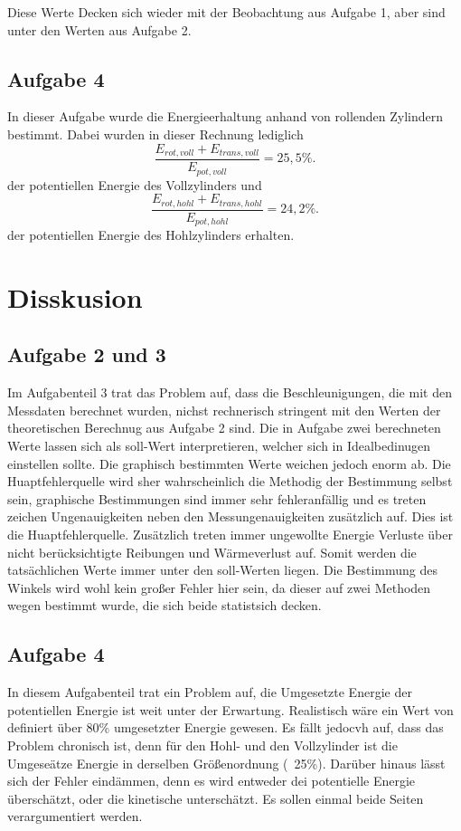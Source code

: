 Diese Werte Decken sich wieder mit der Beobachtung aus Aufgabe 1, aber sind unter den Werten aus Aufgabe 2.

\subsection{Aufgabe 4}
In dieser Aufgabe wurde die Energieerhaltung anhand von rollenden Zylindern bestimmt. Dabei wurden in dieser Rechnung lediglich 
\begin{equation}
    \frac{E_{rot,voll} + E_{trans,voll} }{E_{pot,voll}} = 25,5\%.
\end{equation}
der potentiellen Energie des Vollzylinders und 
\begin{equation}
    \frac{E_{rot,hohl} + E_{trans,hohl} }{E_{pot,hohl}} = 24,2\%.
\end{equation}
der potentiellen Energie des Hohlzylinders erhalten. 


\section{Disskusion}
\subsection{Aufgabe 2 und 3}
Im Aufgabenteil 3 trat das Problem auf, dass die Beschleunigungen, die mit den Messdaten berechnet wurden, nichst rechnerisch stringent mit den Werten der theoretischen Berechnug aus Aufgabe 2 sind. Die in Aufgabe zwei berechneten Werte lassen sich als soll-Wert interpretieren, welcher sich in Idealbedinugen einstellen sollte. Die graphisch bestimmten Werte weichen jedoch enorm ab. Die Huaptfehlerquelle wird sher wahrscheinlich die Methodig der Bestimmung selbst sein, graphische Bestimmungen sind immer sehr fehleranfällig und es treten zeichen Ungenauigkeiten neben den Messungenauigkeiten zusätzlich auf. Dies ist die Huaptfehlerquelle. Zusätzlich treten immer ungewollte Energie Verluste über nicht berücksichtigte Reibungen und Wärmeverlust auf. Somit werden die tatsächlichen Werte immer unter den soll-Werten liegen. Die Bestimmung des Winkels wird wohl kein großer Fehler hier sein, da dieser auf zwei Methoden wegen bestimmt wurde, die sich beide statistsich decken. 

\subsection{Aufgabe 4}
In diesem Aufgabenteil trat ein Problem auf, die Umgesetzte Energie der potentiellen Energie ist weit unter der Erwartung. Realistisch wäre ein Wert von definiert über 80\% umgesetzter Energie gewesen. Es fällt jedocvh auf, dass das Problem chronisch ist, denn für den Hohl- und den Vollzylinder ist die Umgeseätze Energie in derselben Größenordnung (~25\%). 
Darüber hinaus lässt sich der Fehler eindämmen, denn es wird entweder dei potentielle Energie überschätzt, oder die kinetische unterschätzt. Es sollen einmal beide Seiten verargumentiert werden.
